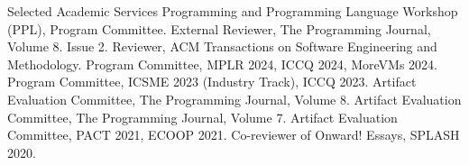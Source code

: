 \begin{rubric}{Selected Academic Services}
  \entry*[2025] Programming and Programming Language Workshop (PPL), Program Committee.
  \entry*[2024] External Reviewer, The Programming Journal, Volume 8. Issue 2.
  \entry*[2024] Reviewer, ACM Transactions on Software Engineering and Methodology.
  \entry*[2024] Program Committee, MPLR 2024, ICCQ 2024, MoreVMs 2024.
  \entry*[2023] Program Committee, ICSME 2023 (Industry Track), ICCQ 2023.
  \entry*[2023] Artifact Evaluation Committee, The Programming Journal, Volume 8.
  \entry*[2022] Artifact Evaluation Committee, The Programming Journal, Volume 7.
  \entry*[2021] Artifact Evaluation Committee, PACT 2021, ECOOP 2021.
  \entry*[2020] Co-reviewer of Onward! Essays, SPLASH 2020.
\end{rubric}
